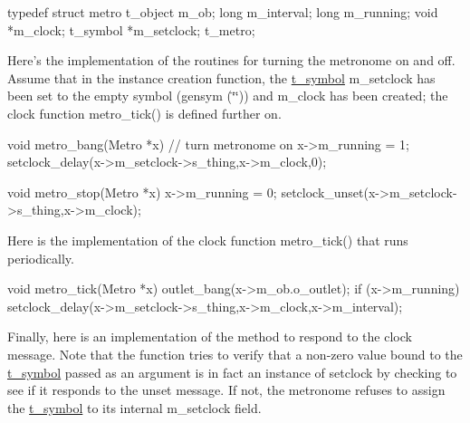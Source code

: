 \begin{DoxyCode}
    typedef struct metro 
    { 
        t_object m_ob; 
        long m_interval; 
        long m_running; 
        void *m_clock; 
        t_symbol *m_setclock; 
    } t_metro;
\end{DoxyCode}


Here’s the implementation of the routines for turning the metronome on and off. Assume that in the instance creation function, the \hyperlink{structt__symbol}{t\_\-symbol} m\_\-setclock has been set to the empty symbol (gensym (\char`\"{}\char`\"{})) and m\_\-clock has been created; the clock function metro\_\-tick() is defined further on.


\begin{DoxyCode}
    void metro_bang(Metro *x) // turn metronome on
    { 
        x->m_running = 1; 
        setclock_delay(x->m_setclock->s_thing,x->m_clock,0); 
    } 

    void metro_stop(Metro *x) 
    { 
        x->m_running = 0; 
        setclock_unset(x->m_setclock->s_thing,x->m_clock); 
    }
\end{DoxyCode}


Here is the implementation of the clock function metro\_\-tick() that runs periodically.


\begin{DoxyCode}
    void metro_tick(Metro *x) 
    { 
        outlet_bang(x->m_ob.o_outlet); 
        if (x->m_running) 
            setclock_delay(x->m_setclock->s_thing,x->m_clock,x->m_interval); 
    } 
\end{DoxyCode}


Finally, here is an implementation of the method to respond to the clock message. Note that the function tries to verify that a non-\/zero value bound to the \hyperlink{structt__symbol}{t\_\-symbol} passed as an argument is in fact an instance of setclock by checking to see if it responds to the unset message. If not, the metronome refuses to assign the \hyperlink{structt__symbol}{t\_\-symbol} to its internal m\_\-setclock field.


